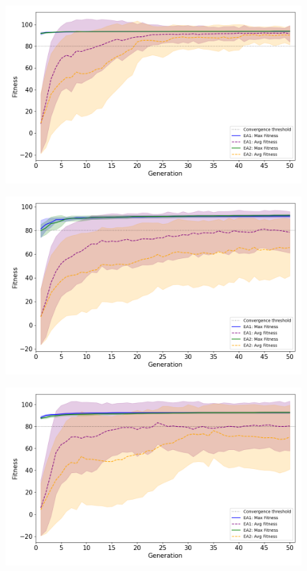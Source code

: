 \begin{figure}[htbp]
    \centering
    \includegraphics[width=\linewidth]{../../plots/enemy2}
    \caption{}
    \label{fig:enemy2}
\end{figure}
\begin{figure}[htbp]
    \centering
    \includegraphics[width=\linewidth]{../../plots/enemy7}
    \caption{}
    \label{fig:enemy7}
\end{figure}
\begin{figure}[htbp]
    \centering
    \includegraphics[width=\linewidth]{../../plots/enemy8}
    \caption{}
    \label{fig:enemy8}
\end{figure}


